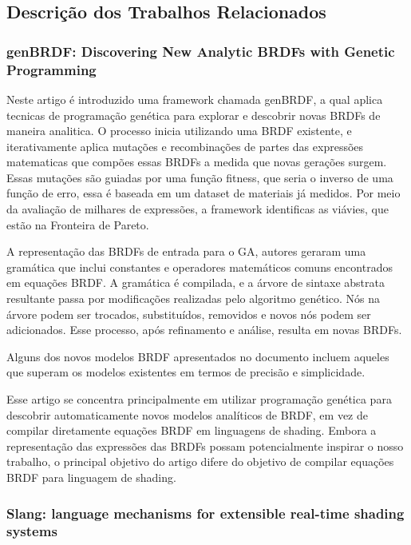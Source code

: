 \documentclass[english, 
               brazil, 
               bsc] %
               {dcomp-abntex2}
\begin{document}
\subsection{Descrição dos Trabalhos Relacionados}

\subsubsection{genBRDF: Discovering New Analytic BRDFs with Genetic Programming}

Neste artigo é introduzido uma framework chamada genBRDF, a qual aplica tecnicas de programação genética para explorar e descobrir novas BRDFs de maneira analitica. O processo inicia utilizando uma BRDF existente, e iterativamente aplica mutações e recombinações de partes das expressões matematicas que compões essas BRDFs a medida que novas gerações surgem. Essas mutações são guiadas por uma função fitness, que seria o inverso de uma função de erro, essa é baseada em um dataset de materiais já medidos. Por meio da avaliação de milhares de expressões, a framework identificas as viávies, que estão na Fronteira de Pareto.

A representação das BRDFs de entrada para o GA, autores geraram uma gramática que inclui constantes e operadores matemáticos comuns encontrados em equações BRDF. A gramática é compilada, e a árvore de sintaxe abstrata resultante passa por modificações realizadas pelo algoritmo genético. Nós na árvore podem ser trocados, substituídos, removidos e novos nós podem ser adicionados. Esse processo, após refinamento e análise, resulta em novas BRDFs.

Alguns dos novos modelos BRDF apresentados no documento incluem aqueles que superam os modelos existentes em termos de precisão e simplicidade.
 
Esse artigo se concentra principalmente em utilizar programação genética para descobrir automaticamente novos modelos analíticos de BRDF, em vez de compilar diretamente equações BRDF em linguagens de shading. Embora a representação das expressões das BRDFs possam potencialmente inspirar o nosso trabalho, o principal objetivo do artigo difere do objetivo de compilar equações BRDF para linguagem de shading.

\subsubsection{Slang: language mechanisms for extensible real-time shading systems}
\end{document}
